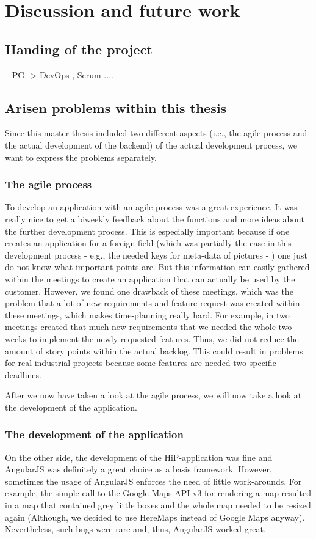 \chapter[Discussion and future work]{Discussion and future work}
\section{Handing of the project}
-- PG -> DevOps , Scrum ....

\section{Arisen problems within this thesis}
Since this master thesis included two different aspects (i.e., the agile process and the actual development of the backend) of the actual development process, we want to express the problems separately. 

\subsection{The agile process}
To develop an application with an agile process was a great experience. It was really nice to get a biweekly feedback about the functions and more ideas about the further development process. This is especially important because if one creates an application for a foreign field (which was partially the case in this development process - e.g., the needed keys for meta-data of pictures - ) one just do not know what important points are. But this information can easily gathered within the meetings to create an application that can actually be used by the customer. 
However, we found one drawback of these meetings, which was the problem that a lot of new requirements and feature request was created within these meetings, which makes time-planning really hard. For example, in two meetings created that much new requirements that we needed the whole two weeks to implement the newly requested features. Thus, we did not reduce the amount of story points within the actual backlog. This could result in problems for real industrial projects because some features are needed two specific deadlines.

After we now have taken a look at the agile process, we will now take a look at the development of the application.   

\subsection{The development of the application}
On the other side, the development of the \ac{HiP}-application was fine and AngularJS was definitely a great choice as a basis framework. However, sometimes the usage of AngularJS enforces the need of little work-arounds. For example, the simple call to the Google Maps API v3 for rendering a map resulted in a map that contained grey little boxes and the whole map needed to be resized again (Although, we decided to use HereMaps instead of Google Maps anyway). Nevertheless, such bugs were rare and, thus, AngularJS worked great. 

